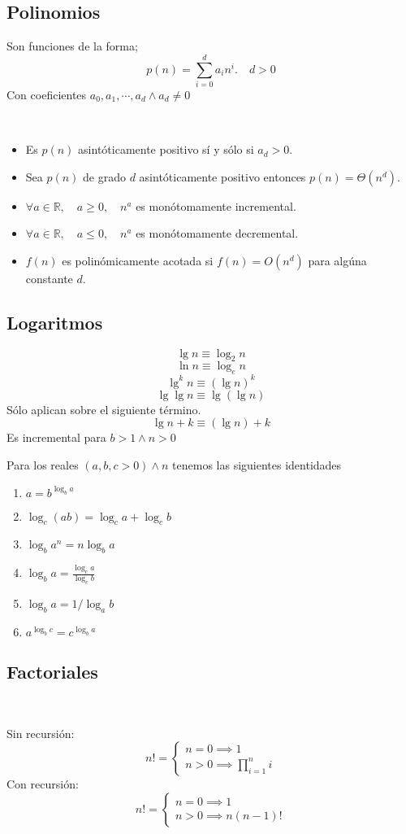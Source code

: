 \subsection{Polinomios}
Son funciones de la forma;
$$
	p(n)=\sum_{i=0}^d a_in^i.\quad d>0
$$
Con coeficientes $a_0,a_1, \cdots,a_d\land a_d\neq0$
\begin{theorem}~
	\begin{itemize}
		\item Es $p(n)$ asintóticamente positivo sí y sólo si $a_d>0$.
		\item Sea $p(n)$ de grado $d$ asintóticamente positivo entonces $p(n)=\Theta(n^d)$.
		\item $\forall a\in \mathbb R,\quad a\ge0,\quad n^a$ es monótomamente incremental.
		\item $\forall a\in \mathbb R,\quad a\le0,\quad n^a$ es monótomamente decremental.
		\item $f(n)$ es polinómicamente acotada si $f(n)=O(n^d)$ para algúna constante $d$.
	\end{itemize}
\end{theorem}

\subsection{Logaritmos}
\begin{definition}[Notaciones]
	$$\lg n\equiv \log_2 n$$
	$$\ln n\equiv \log_e n$$
	$$\lg^k n\equiv (\lg n)^k$$
	$$\lg\lg n\equiv \lg(\lg n)$$
	Sólo aplican sobre el siguiente término.
	$$ \lg n+k\equiv (\lg n) +k $$
	Es incremental para $b>1\land n>0$
\end{definition}


\begin{theorem}[Identidades]
	Para los reales $(a,b,c>0)\land n$ tenemos las siguientes identidades
	\begin{enumerate}
		\item $a=b^{\log_ba}$
		\item $\log_c(ab)=\log_ca+\log_cb$
		\item $\log_ba^n=n\log_ba$
		\item $\log_ba=\frac{\log_ca}{\log_cb}$
		\item $\log_ba=1/\log_ab$
		\item $a^{\log_bc}=c^{\log_ba}$
	\end{enumerate}
\end{theorem}

\subsection{Factoriales}
\begin{definition}~

	Sin recursión:
	$$n!=
		\begin{cases}
			n=0\implies 1 \\
			n>0\implies \prod_{i=1}^n i
		\end{cases}$$
	Con recursión:
	$$n!=
		\begin{cases}
			n=0 \implies 1 \\
			n>0 \implies n(n-1)!
		\end{cases}$$
\end{definition}

